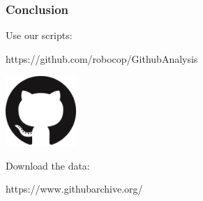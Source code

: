 \documentclass[12pt,t]{beamer}
\begin{document}
\begin{frame}
    \frametitle{Conclusion}
    
    Use our scripts:
    \begin{center}
      https://github.com/robocop/GithubAnalysis
    \end{center}
   
    \begin{center}
        \includegraphics[width=0.2\textwidth]{octocat2.png}
    \end{center}

    Download the data:
    \begin{center}
      https://www.githubarchive.org/
    \end{center}

\end{frame}
\end{document}
